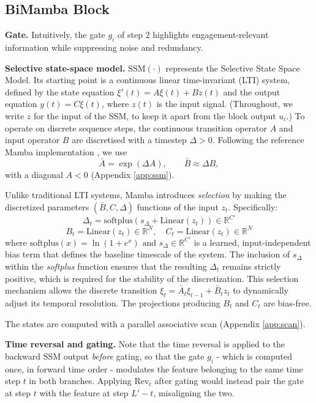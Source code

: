 \documentclass[10pt,a4paper,twocolumn]{article}
\newcommand{\R}{\mathbb{R}}
\begin{document}
	\subsection*{BiMamba Block}
	\textbf{Gate.} Intuitively, the gate $g_{i}$ of step 2 highlights engagement-relevant information while suppressing noise and redundancy.

	\textbf{Selective state-space model.} $\text{SSM}(\cdot)$ represents the Selective State Space Model. Its starting point is a continuous linear time-invariant (LTI) system, defined by the state equation $\xi'(t) = A \xi(t) + B z(t)$ and the output equation $y(t) = C \xi(t)$, where $z(t)$ is the input signal. (Throughout, we write $z$ for the input of the SSM, to keep it apart from the block output $u_i$.) To operate on discrete sequence steps, the continuous transition operator $A$ and input operator $B$ are discretised with a timestep $\Delta > 0$. Following the reference Mamba implementation \cite{gu2023mamba}, we use
	$$\bar{A} = \exp(\Delta A), \qquad \bar{B} \approx \Delta B,$$
	with a diagonal $A < 0$ (Appendix \ref{app:ssm}).

	Unlike traditional LTI systems, Mamba introduces \textit{selection} by making the discretized parameters $(\bar{B}, C, \Delta)$ functions of the input $z_t$. Specifically:
	$$ \Delta_t = \text{softplus}(s_{\Delta} + \text{Linear}(z_t)) \in \R^{C'} $$
	$$ B_t = \text{Linear}(z_t) \in \R^{N}, \quad C_t = \text{Linear}(z_t) \in \R^{N} $$
	where $ \text{softplus}(x) = \ln(1 + e^x) \text{ and } s_{\Delta} \in \mathbb{R}^{C'} $ is a learned, input-independent bias term that defines the baseline timescale of the system. The inclusion of $s_{\Delta}$ within the \textit{softplus} function ensures that the resulting $\Delta_t$ remains strictly positive, which is required for the stability of the discretization. This selection mechanism allows the discrete transition $\xi_t = \bar{A}_t \xi_{t-1} + \bar{B}_t z_t$ to dynamically adjust its temporal resolution. The projections producing $B_t$ and $C_t$ are bias-free.
	
	The states are computed with a parallel associative scan (Appendix \ref{app:scan}).

	\textbf{Time reversal and gating.} Note that the time reversal is applied to the backward SSM output \emph{before} gating, so that the gate $g_i$ - which is computed once, in forward time order - modulates the feature belonging to the same time step $t$ in both branches. Applying $\text{Rev}_t$ after gating would instead pair the gate at step $t$ with the feature at step $L'-t$, misaligning the two.
\end{document}
